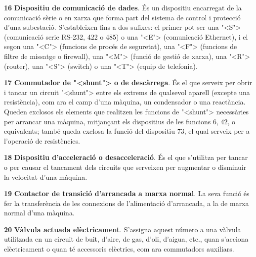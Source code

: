 \begin{multicols}{2}
\begin{list}{}
\item[\textbf{16}]  
\textbf{Dispositiu de comunicaci\'{o} de dades}. \'{E}s un dispositiu encarregat de la comunicaci\'{o} s\`{e}rie o en xarxa que forma part del  sistema de control i protecci\'{o} d'una subestaci\'{o}. S'estableixen fins a dos sufixes: el primer pot ser una {"<}S{">} (comunicaci\'{o} serie RS-232, 422 o 485) o una {"<}E{">} (comunicaci\'{o} Ethernet), i el segon una {"<}C{">} (funcions de proc\'{e}s de seguretat), una {"<}F{">} (funcions de filtre de missatge o firewall), una {"<}M{">} (funci\'{o} de gesti\'{o} de xarxa), una  {"<}R{">} (router), una {"<}S{">} (switch) o una {"<}T{">} (equip de telefonia).

\item[\textbf{17}]   
  
\textbf{Commutador de  {"<}shunt{">} o de desc\`{a}rrega}. \'{E}s el que serveix per obrir i tancar
un circuit {"<}shunt{">} entre els extrems de qualsevol aparell (excepte
una resist\`{e}ncia), com ara el camp d'una m\`{a}quina, un condensador o
una react\`{a}ncia. Queden exclosos els elements que realitzen les
funcions de {"<}shunt{">} necess\`{a}ries per arrancar una m\`{a}quina, mitjan\c{c}ant
els dispositius de les funcions 6, 42, o equivalents; tamb\'{e} queda exclosa la funci\'{o}
del dispositiu 73, el qual serveix per a l'operaci\'{o} de resist\`{e}ncies.

\item[\textbf{18}]  
 \textbf{Dispositiu d'acceleraci\'{o} o desacceleraci\'{o}}. \'{E}s
el que s'utilitza per tancar o per causar el tancament dels circuits
que serveixen per augmentar o disminuir la velocitat d'una m\`{a}quina.

\item[\textbf{19}]  
\textbf{Contactor de transici\'{o} d'arrancada a marxa normal}. La seva
funci\'{o} \'{e}s fer la transfer\`{e}ncia de les connexions de l'alimentaci\'{o}
d'arrancada, a la de marxa normal d'una m\`{a}quina.

\item[\textbf{20}]  
 \textbf{V\`{a}lvula actuada el\`{e}ctricament}. S'assigna aquest n\'{u}mero a una v\`{a}lvula
utilitzada en un circuit de buit, d'aire, de gas, d'oli, d'aigua,
etc., quan s'acciona el\`{e}ctricament o quan t\'{e} accessoris el\`{e}ctrics,
com ara commutadors auxiliars.


\end{list}
\end{multicols}

